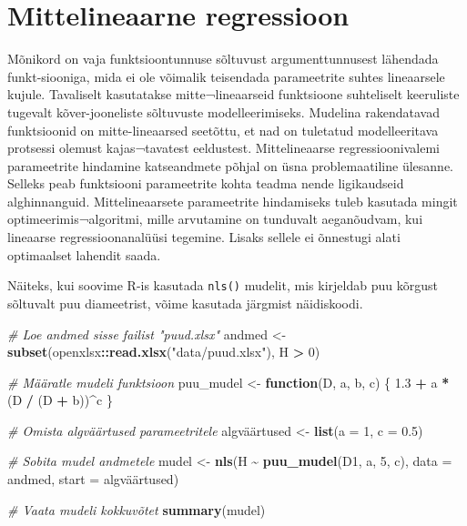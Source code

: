 \documentclass[
]{book}
\newenvironment{Shaded}{\begin{snugshade}}{\end{snugshade}}
\newcommand{\AttributeTok}[1]{\textcolor[rgb]{0.13,0.29,0.53}{#1}}
\newcommand{\CommentTok}[1]{\textcolor[rgb]{0.56,0.35,0.01}{\textit{#1}}}
\newcommand{\ControlFlowTok}[1]{\textcolor[rgb]{0.13,0.29,0.53}{\textbf{#1}}}
\newcommand{\DecValTok}[1]{\textcolor[rgb]{0.00,0.00,0.81}{#1}}
\newcommand{\FloatTok}[1]{\textcolor[rgb]{0.00,0.00,0.81}{#1}}
\newcommand{\FunctionTok}[1]{\textcolor[rgb]{0.13,0.29,0.53}{\textbf{#1}}}
\newcommand{\NormalTok}[1]{#1}
\newcommand{\OtherTok}[1]{\textcolor[rgb]{0.56,0.35,0.01}{#1}}
\newcommand{\SpecialCharTok}[1]{\textcolor[rgb]{0.81,0.36,0.00}{\textbf{#1}}}
\newcommand{\StringTok}[1]{\textcolor[rgb]{0.31,0.60,0.02}{#1}}
\renewenvironment{Shaded} {\begin{snugshade}\footnotesize} {\end{snugshade}}
\begin{document}
\chapter{Mittelineaarne regressioon}\label{mittelineaarne-regressioon}

Mõnikord on vaja funktsioontunnuse sõltuvust argumenttunnusest lähendada funkt-siooniga, mida ei ole võimalik teisendada parameetrite suhtes lineaarsele kujule. Tavaliselt kasutatakse mitte¬lineaarseid funktsioone suhteliselt keeruliste tugevalt kõver-jooneliste sõltuvuste modelleerimiseks. Mudelina rakendatavad funktsioonid on mitte-lineaarsed seetõttu, et nad on tuletatud modelleeritava protsessi olemust kajas¬tavatest eeldustest.
Mittelineaarse regressioonivalemi parameetrite hindamine katseandmete põhjal on üsna problemaatiline ülesanne. Selleks peab funktsiooni parameetrite kohta teadma nende ligikaudseid alghinnanguid. Mittelineaarsete parameetrite hindamiseks tuleb kasutada mingit optimeerimis¬algoritmi, mille arvutamine on tunduvalt aeganõudvam, kui lineaarse regressioonanalüüsi tegemine. Lisaks sellele ei õnnestugi alati optimaalset lahendit saada.

Näiteks, kui soovime R-is kasutada \texttt{nls()} mudelit, mis kirjeldab puu kõrgust sõltuvalt puu diameetrist, võime kasutada järgmist näidiskoodi.

\begin{Shaded}
\begin{Highlighting}[]
\CommentTok{\# Loe andmed sisse failist "puud.xlsx"}
\NormalTok{andmed }\OtherTok{\textless{}{-}} \FunctionTok{subset}\NormalTok{(openxlsx}\SpecialCharTok{::}\FunctionTok{read.xlsx}\NormalTok{(}\StringTok{"data/puud.xlsx"}\NormalTok{), H }\SpecialCharTok{\textgreater{}} \DecValTok{0}\NormalTok{)}

\CommentTok{\# Määratle mudeli funktsioon}
\NormalTok{puu\_mudel }\OtherTok{\textless{}{-}} \ControlFlowTok{function}\NormalTok{(D, a, b, c) \{}
 \FloatTok{1.3} \SpecialCharTok{+}\NormalTok{ a }\SpecialCharTok{*}\NormalTok{ (D }\SpecialCharTok{/}\NormalTok{ (D }\SpecialCharTok{+}\NormalTok{ b))}\SpecialCharTok{\^{}}\NormalTok{c}
\NormalTok{\}}

\CommentTok{\# Omista algväärtused parameetritele}
\NormalTok{algväärtused }\OtherTok{\textless{}{-}} \FunctionTok{list}\NormalTok{(}\AttributeTok{a =} \DecValTok{1}\NormalTok{, }\AttributeTok{c =} \FloatTok{0.5}\NormalTok{)}

\CommentTok{\# Sobita mudel andmetele}
\NormalTok{mudel }\OtherTok{\textless{}{-}} \FunctionTok{nls}\NormalTok{(H }\SpecialCharTok{\textasciitilde{}} \FunctionTok{puu\_mudel}\NormalTok{(D1, a, }\DecValTok{5}\NormalTok{, c), }\AttributeTok{data =}\NormalTok{ andmed, }\AttributeTok{start =}\NormalTok{ algväärtused)}

\CommentTok{\# Vaata mudeli kokkuvõtet}
\FunctionTok{summary}\NormalTok{(mudel)}
\end{Highlighting}
\end{Shaded}
\end{document}
